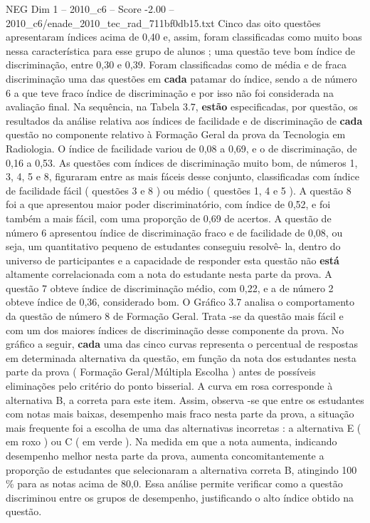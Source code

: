 \begin{textsample}{NEG Dim 1 – 2010\_c6 – Score -2.00 – 2010\_c6/enade\_2010\_tec\_rad\_711bf0db15.txt}
Cinco das oito questões apresentaram índices acima de 0,40 e, assim, foram classificadas como muito boas nessa característica para esse grupo de alunos ; uma questão teve bom índice de discriminação, entre 0,30 e 0,39.
Foram classificadas como de média e de fraca discriminação uma das questões em \textbf{cada} patamar do índice, sendo a de número 6 a que teve fraco índice de discriminação e por isso não foi considerada na avaliação final.
Na sequência, na Tabela 3.7, \textbf{estão} especificadas, por questão, os resultados da análise relativa aos índices de facilidade e de discriminação de \textbf{cada} questão no componente relativo à Formação Geral da prova da Tecnologia em Radiologia.
O índice de facilidade variou de 0,08 a 0,69, e o de discriminação, de 0,16 a 0,53.
As questões com índices de discriminação muito bom, de números 1, 3, 4, 5 e 8, figuraram entre as mais fáceis desse conjunto, classificadas com índice de facilidade fácil ( questões 3 e 8 ) ou médio ( questões 1, 4 e 5 ).
A questão 8 foi a que apresentou maior poder discriminatório, com índice de 0,52, e foi também a mais fácil, com uma proporção de 0,69 de acertos.
A questão de número 6 apresentou índice de discriminação fraco e de facilidade de 0,08, ou seja, um quantitativo pequeno de estudantes conseguiu resolvê- la, dentro do universo de participantes e a capacidade de responder esta questão não \textbf{está} altamente correlacionada com a nota do estudante nesta parte da prova.
A questão 7 obteve índice de discriminação médio, com 0,22, e a de número 2 obteve índice de 0,36, considerado bom.
O Gráfico 3.7 analisa o comportamento da questão de número 8 de Formação Geral.
Trata -se da questão mais fácil e com um dos maiores índices de discriminação desse componente da prova.
No gráfico a seguir, \textbf{cada} uma das cinco curvas representa o percentual de respostas em determinada alternativa da questão, em função da nota dos estudantes nesta parte da prova ( Formação Geral/Múltipla Escolha ) antes de possíveis eliminações pelo critério do ponto bisserial.
A curva em rosa corresponde à alternativa B, a correta para este item.
Assim, observa -se que entre os estudantes com notas mais baixas, desempenho mais fraco nesta parte da prova, a situação mais frequente foi a escolha de uma das alternativas incorretas : a alternativa E ( em roxo ) ou C ( em verde ).
Na medida em que a nota aumenta, indicando desempenho melhor nesta parte da prova, aumenta concomitantemente a proporção de estudantes que selecionaram a alternativa correta B, atingindo 100 \% para as notas acima de 80,0.
Essa análise permite verificar como a questão discriminou entre os grupos de desempenho, justificando o alto índice obtido na questão.

\end{textsample}
